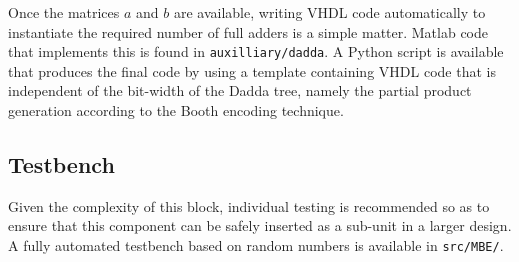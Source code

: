 Once the matrices $a$ and $b$ are available, writing VHDL code automatically to instantiate the required number of full adders is a simple matter. Matlab code that implements this is found in \texttt{auxilliary/dadda}. A Python script is available that produces the final code by using a template containing VHDL code that is independent of the bit-width of the Dadda tree, namely the partial product generation according to the Booth encoding technique.


\subsection{Testbench} Given the complexity of this block, individual testing is recommended so as to ensure that this component can be safely inserted as a sub-unit in a larger design. A fully automated testbench based on random numbers is available in \texttt{src/MBE/}.
